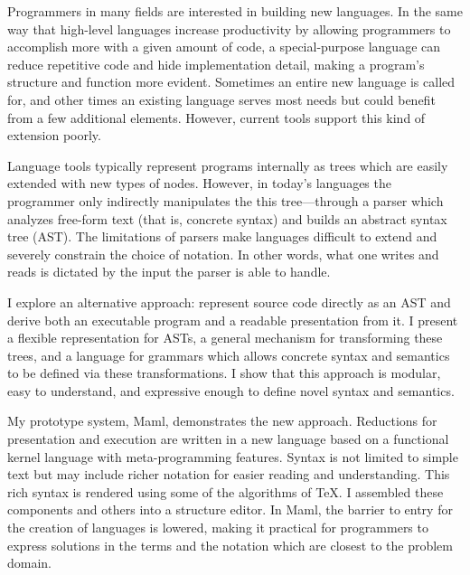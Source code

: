 Programmers in many fields are interested in building new languages. In the same way that high-level languages increase productivity by allowing programmers to accomplish more with a given amount of code, a special-purpose language can reduce repetitive code and hide implementation detail, making a program's structure and function more evident. Sometimes an entire new language is called for, and other times an existing language serves most needs but could benefit from a few additional elements. However, current tools support this kind of extension poorly.

Language tools typically represent programs internally as trees which are easily extended with new types of nodes. However, in today's languages the programmer only indirectly manipulates the this tree---through a parser which analyzes free-form text (that is, concrete syntax) and builds an abstract syntax tree (AST). The limitations of parsers make languages difficult to extend and severely constrain the choice of notation. In other words, what one writes and reads is dictated by the input the parser is able to handle.

I explore an alternative approach: represent source code directly as an AST and derive both an executable program and a readable presentation from it. I present a flexible representation for ASTs, a general mechanism for transforming these trees, and a language for grammars which allows concrete syntax and semantics to be defined via these transformations. I show that this approach is modular, easy to understand, and expressive enough to define novel syntax and semantics.

My prototype system, Maml, demonstrates the new approach. Reductions for presentation and execution are written in a new language based on a functional kernel language with meta-programming features. Syntax is not limited to simple text but may include richer notation for easier reading and understanding. This rich syntax is rendered using some of the algorithms of \TeX. I assembled these components and others into a structure editor. In Maml, the barrier to entry for the creation of languages is lowered, making it practical for programmers to express solutions in the terms and the notation which are closest to the problem domain.